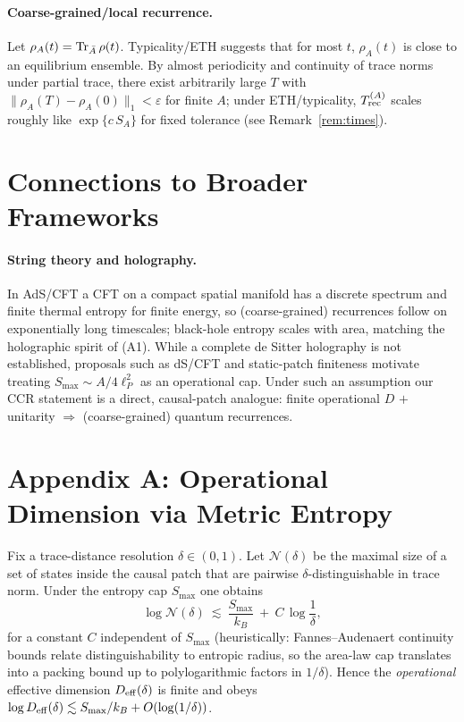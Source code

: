 \documentclass[12pt]{article}
\theoremstyle{remark}
\begin{document}
\paragraph{Coarse-grained/local recurrence.} Let $\rho_A(t)=\Tr_{\bar A}\rho(t)$. Typicality/ETH suggests that for most $t$, $\rho_A(t)$ is close to an equilibrium ensemble. By almost periodicity and continuity of trace norms under partial trace, there exist arbitrarily large $T$ with $\|\rho_A(T)-\rho_A(0)\|_1<\varepsilon$ for finite $A$; under ETH/typicality, $T^{(A)}_{\rm rec}$ scales roughly like $\exp\{c\,S_A\}$ for fixed tolerance (see Remark~\ref{rem:times}).

\section{Connections to Broader Frameworks}

\paragraph{String theory and holography.}
In AdS/CFT a CFT on a compact spatial manifold has a discrete spectrum and finite thermal entropy for finite energy, so (coarse-grained) recurrences follow on exponentially long timescales; black-hole entropy scales with area, matching the holographic spirit of (A1). While a complete de Sitter holography is not established, proposals such as dS/CFT and static-patch finiteness motivate treating $S_{\max}\!\sim\! A/4\ell_P^2$ as an operational cap. Under such an assumption our CCR statement is a direct, causal-patch analogue: finite operational $D$ $+$ unitarity $\Rightarrow$ (coarse-grained) quantum recurrences.

\appendix
\section*{Appendix A: Operational Dimension via Metric Entropy}
Fix a trace-distance resolution $\delta\in(0,1)$. Let $\mathcal{N}(\delta)$ be the maximal size of a set of states inside the causal patch that are pairwise $\delta$-distinguishable in trace norm. Under the entropy cap $S_{\max}$ one obtains
\[
\log \mathcal{N}(\delta)\ \lesssim\ \frac{S_{\max}}{k_B}\ +\ C\,\log\!\frac{1}{\delta},
\]
for a constant $C$ independent of $S_{\max}$ (heuristically: Fannes--Audenaert continuity bounds relate distinguishability to entropic radius, so the area-law cap translates into a packing bound up to polylogarithmic factors in $1/\delta$). Hence the \emph{operational} effective dimension $D_{\rm eff}(\delta)$ is finite and obeys $\log D_{\rm eff}(\delta)\lesssim S_{\max}/k_B+O(\log(1/\delta))$.
\end{document}
